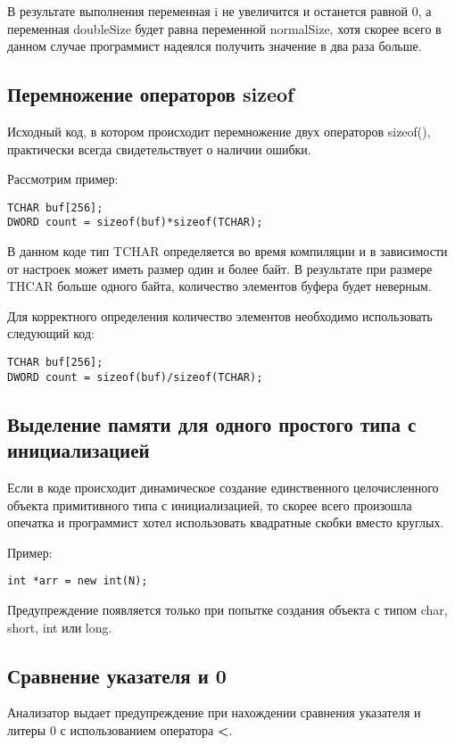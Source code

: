 В результате выполнения переменная i не увеличится и останется равной 0, а переменная doubleSize
будет равна переменной normalSize, хотя скорее всего в данном случае программист надеялся получить
значение в два раза больше. 

\subsection{Перемножение операторов sizeof}
\label{sec:sizeofMul}
Исходный код, в котором происходит перемножение двух операторов sizeof(), практически всегда
свидетельствует о наличии ошибки.

Рассмотрим пример:
\begin{lstlisting}
TCHAR buf[256];
DWORD count = sizeof(buf)*sizeof(TCHAR);
\end{lstlisting}

В данном коде тип TCHAR определяется во время компиляции и в зависимости от настроек
может иметь размер один и более байт. В результате при размере THCAR больше одного байта,
количество элементов буфера будет неверным. 

Для корректного определения количество элементов необходимо использовать следующий код:
\begin{lstlisting}
TCHAR buf[256];
DWORD count = sizeof(buf)/sizeof(TCHAR);
\end{lstlisting}

\subsection{Выделение памяти для одного простого типа с инициализацией}
\label{sec:new}
Если в коде происходит динамическое создание единственного целочисленного объекта примитивного типа с
инициализацией, то скорее всего произошла опечатка и программист хотел использовать
квадратные скобки вместо круглых.

Пример:
\begin{lstlisting}
int *arr = new int(N);
\end{lstlisting}

Предупреждение появляется только при попытке создания объекта с типом char, short, int или long.

\subsection{Сравнение указателя и 0}
\label{sec:ptrCmp}
Анализатор выдает предупреждение при нахождении сравнения указателя и литеры 0 с использованием 
оператора \textbf{<}.

